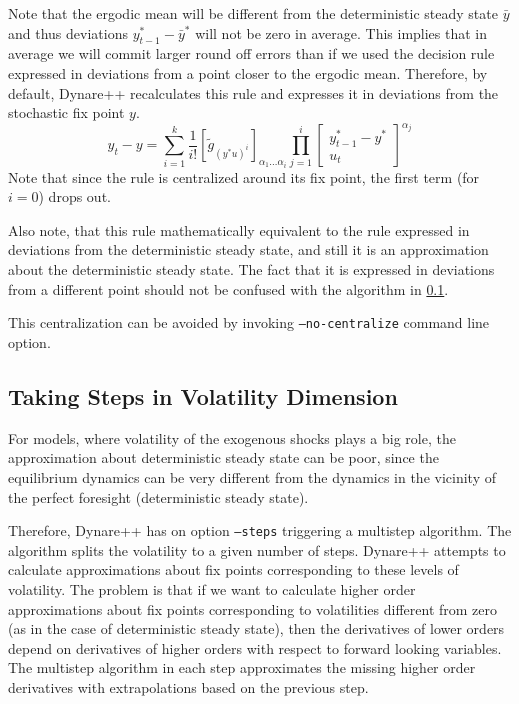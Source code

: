 \documentclass[10pt]{article}
\begin{document}
Note that the ergodic mean will be different from the deterministic
steady state $\bar y$ and thus deviations $y^*_{t-1}-\bar y^*$ will
not be zero in average. This implies that in average we will commit
larger round off errors than if we used the decision rule expressed in
deviations from a point closer to the ergodic mean. Therefore, by
default, Dynare++ recalculates this rule and expresses it in
deviations from the stochastic fix point $y$.
\[
y_t-y = \sum_{i=1}^k\frac{1}{i!}\left[\tilde g_{(y^*u)^i}\right]
_{\alpha_1\ldots\alpha_i}
\prod_{j=1}^i\left[\begin{array}{c} y^*_{t-1}-y^*\\ u_t \end{array}\right]
^{\alpha_j}
\]
Note that since the rule is centralized around its fix point, the
first term (for $i=0$) drops out.

Also note, that this rule mathematically equivalent to the rule
expressed in deviations from the deterministic steady state, and still
it is an approximation about the deterministic steady state. The fact
that it is expressed in deviations from a different point should not
be confused with the algorithm in \ref{multistep_alg}.

This centralization can be avoided by invoking {\tt --no-centralize}
command line option.

\subsection{Taking Steps in Volatility Dimension}
\label{multistep_alg}

For models, where volatility of the exogenous shocks plays a big
role, the approximation about deterministic steady state can be poor,
since the equilibrium dynamics can be very different from the dynamics
in the vicinity of the perfect foresight (deterministic steady state).

Therefore, Dynare++ has on option {\tt --steps} triggering a multistep
algorithm. The algorithm splits the volatility to a given number of
steps. Dynare++ attempts to calculate approximations about fix points
corresponding to these levels of volatility. The problem is that if we
want to calculate higher order approximations about fix points
corresponding to volatilities different from zero (as in the case of
deterministic steady state), then the derivatives of lower orders
depend on derivatives of higher orders with respect to forward looking
variables. The multistep algorithm in each step approximates the
missing higher order derivatives with extrapolations based on the
previous step.
\end{document}
